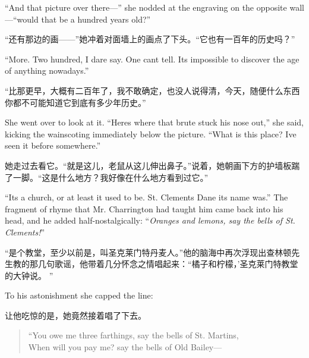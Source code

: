 \begin{paracol}{2}
\switchcolumn*

``And that picture over there---'' she nodded at the engraving on the
opposite wall---``would that be a hundred years old?''

\switchcolumn

``还有那边的画——''她冲着对面墙上的画点了下头。``它也有一百年的历史吗？''

\switchcolumn*

``More. Two hundred, I dare say. One can\textquotesingle t tell.
It\textquotesingle s impossible to discover the age of anything
nowadays.''

\switchcolumn

``比那更早，大概有二百年了，我不敢确定，也没人说得清，今天，随便什么东西你都不可能知道它到底有多少年历史。''

\switchcolumn*

She went over to look at it. ``Here\textquotesingle s where that brute
stuck his nose out,'' she said, kicking the wainscoting immediately below
the picture. ``What is this place? I\textquotesingle ve seen it before
somewhere.''

\switchcolumn

她走过去看它。``就是这儿，老鼠从这儿伸出鼻子。''说着，她朝画下方的护墙板踹了一脚。``这是什么地方？我好像在什么地方看到过它。''

\switchcolumn*

``It\textquotesingle s a church, or at least it used to be. St.
Clement\textquotesingle s Dane its name was.'' The fragment of rhyme that
Mr. Charrington had taught him came back into his head, and he added
half-nostalgically: ``\emph{Oranges and lemons, say the bells of St.
Clement\textquotesingle s!}''

\switchcolumn

``是个教堂，至少以前是，叫圣克莱门特丹麦人。''他的脑海中再次浮现出查林顿先生教的那几句歌谣，他带着几分怀念之情唱起来：``橘子和柠檬，'圣克莱门特教堂的大钟说。
''

\switchcolumn*

To his astonishment she capped the line:

\switchcolumn

让他吃惊的是，她竟然接着唱了下去。

\switchcolumn*

\begin{quotation}
  ``You owe me three farthings, say the bells of St.
  Martin\textquotesingle s,\\
  When will you pay me? say the bells of Old Bailey---
\end{quotation}


\end{paracol}
